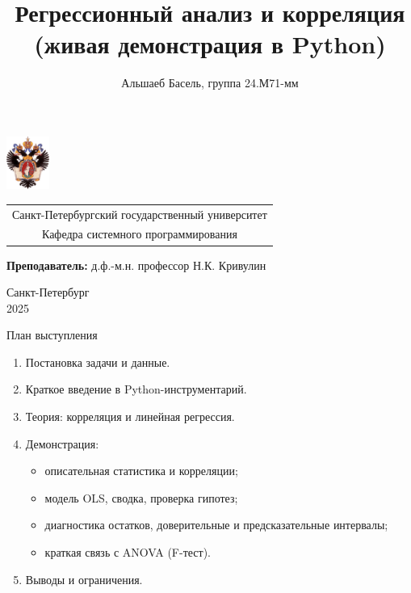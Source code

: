 \documentclass{beamer}
\title[Регрессия и корреляция в Python]{Регрессионный анализ и корреляция\\(живая демонстрация в Python)}
\institute[СПбГУ]{\\ Курс «Методы статистической обработки информации»}
\author[Альшаеб Басель]{Альшаеб Басель, группа 24.М71-мм}
\begin{document}
{
\begin{frame}
  \includegraphics[width=1.4cm]{pictures/SPbGU_Logo.png}
\vspace{-35pt}
\hspace{-10pt}
\begin{center}
   \begin{tabular}{c}
        \scriptsize{Санкт-Петербургский государственный университет} \\
        \scriptsize{Кафедра системного программирования}
    \end{tabular}
\titlepage
\end{center}

\btVFill

{\scriptsize
   \textbf{Преподаватель:} д.ф.-м.н. профессор Н.К. Кривулин \\
 }
\begin{center}
  \vspace{5pt}
  \scriptsize{Санкт-Петербург\\
                 2025}
  \end{center}

\end{frame}
}


\begin{frame}{План выступления}
\begin{enumerate}
  \item Постановка задачи и данные.
  \item Краткое введение в Python-инструментарий.
  \item Теория: корреляция и линейная регрессия.
  \item Демонстрация:
  \begin{itemize}
    \item описательная статистика и корреляции;
    \item модель OLS, сводка, проверка гипотез;
    \item диагностика остатков, доверительные и предсказательные интервалы;
    \item краткая связь с ANOVA (F-тест).
  \end{itemize}
  \item Выводы и ограничения.
\end{enumerate}
\end{frame}
\end{document}
